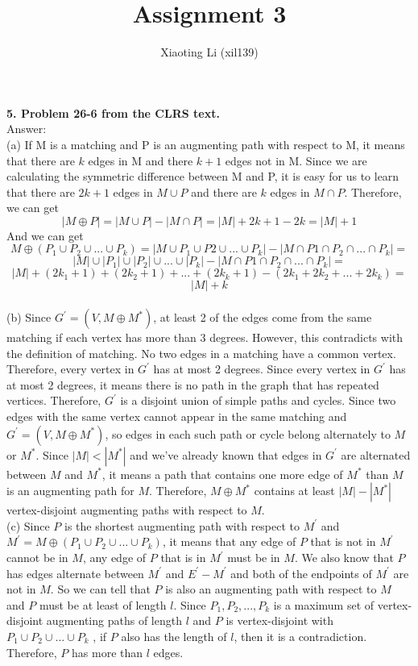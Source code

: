 \documentclass{article}
\title{Assignment 3}
\author{Xiaoting Li (xil139)}
\date{}
\begin{document}
\maketitle
\noindent
\textbf{5. Problem 26-6 from the CLRS text.} \\
\noindent
Answer: \\
(a) If M is a matching and P is an augmenting path with respect to M, it means that there are $k$ edges in M and there $k + 1$ edges not in M. Since we are calculating the symmetric difference between M and P, it is easy for us to learn that there are $2k + 1$ edges in $M\cup P$ and there are $k$ edges in $M\cap P$. Therefore, we can get $$|M \oplus P| = |M\cup P| - |M\cap P| = |M| + 2k + 1 - 2k = |M| + 1$$ And we can get $$M \oplus (P_1\cup P_2 \cup ... \cup P_k )  = |M\cup P_1\cup P2\cup ... \cup P_k| - |M\cap P1\cap P_2\cap ... \cap P_k| = $$ $$|M|\cup |P_1|\cup |P_2|\cup ... \cup |P_k| -  |M\cap P1\cap P_2\cap ... \cap P_k| = $$ $$|M| + (2k_1 + 1) + (2k_2 + 1) + ... + (2k_k + 1) - (2k_1 + 2k_2 + ... + 2k_k) = $$ $$|M| + k$$ \\
(b) Since $G^{'} = (V, M\oplus M^{*})$, at least 2 of the edges come from the same matching if each vertex has more than 3 degrees. However, this contradicts with the definition of matching. No two edges in a matching have a common vertex. Therefore, every vertex in $G^{'}$ has at most 2 degrees. Since every vertex in $G^{'}$ has at most 2 degrees, it means there is no path in the graph that has repeated vertices. Therefore, $G^{'}$ is a disjoint union of simple paths and cycles. Since two edges with the same vertex cannot appear in the same matching and $G^{'} = (V, M\oplus M^{*})$, so edges in each such path or cycle belong alternately to $M$ or $M^{*}$. Since $|M| < |M^{*}|$ and we've already known that edges in $G^{'}$ are alternated between $M$ and $M^{*}$, it means a path that contains one more edge of $M^{*}$ than $M$ is an augmenting path for $M$. Therefore, $M\oplus M^{*}$ contains at least $|M| - |M^{*}|$ vertex-disjoint augmenting paths with respect to $M$.\\ \newline
(c) Since $P$ is the shortest augmenting path with respect to $M^{'}$ and $M^{'} = M\oplus (P_1\cup P_2\cup ... \cup P_k)$, it means that any edge of $P$ that is not in $M^{'}$ cannot be in $M$, any edge of $P$ that is in $M^{'}$ must be in $M$. We also know that $P$ has edges alternate between $M^{'}$ and $E^{'} - M^{'}$ and both of the endpoints of $M^{'}$ are not in $M$. So we can tell that $P$ is also an augmenting path with respect to $M$ and $P$ must be at least of length $l$. Since $P_1, P_2, ... ,P_k$ is a maximum set of vertex-disjoint augmenting paths of length $l$ and $P$ is vertex-disjoint with $P_1\cup P_2\cup ... \cup P_k$ , if $P$ also has the length of $l$, then it is a contradiction. Therefore, $P$ has more than $l$ edges. \\ \newline
\end{document}
